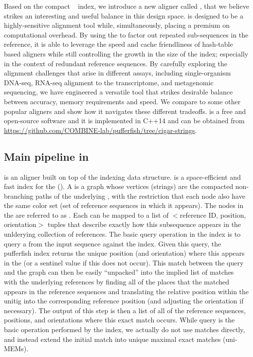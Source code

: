 Based on the compact \pufferfish~\citep{pufferfish} index, we introduce a new aligner called \puffaligner,
that we believe strikes an interesting and useful balance in this design space. \puffaligner is designed 
to be a highly-sensitive alignment tool while, simultaneously, placing a premium on computational overhead.
By using the \ccdbg to factor out repeated sub-sequences in the reference, it is able to leverage the speed 
and cache friendliness of hash-table based aligners while still controlling 
the growth in the size of the index; especially in the context of redundant reference sequences. By carefully 
exploring the alignment challenges that arise in different assays, including single-organism DNA-seq, 
RNA-seq alignment to the transcriptome, and metagenomic sequencing, we have engineered a versatile
tool that strikes desirable balance between accuracy, memory requirements and speed. We compare 
\puffaligner to some other popular aligners and show how it navigates these different tradeoffs. 
\puffaligner is a free and open-source software and it is implemented in C++14 and can be obtained 
from \url{https://github.com/COMBINE-lab/pufferfish/tree/cigar-strings}.

\subsection{Main pipeline in \puffaligner}
\puffaligner is an aligner built on top of the \pufferfish indexing data structure. \pufferfish is a 
space-efficient and fast index for the \ccdbg (\ccdbgshort). A \ccdbg is a graph whose vertices
(strings) are the compacted non-branching paths of the underlying \dbg, with the restriction that 
each node also have the same color set (set of reference sequences in which it appears). The nodes in the
\ccdbg are referred to as \unitigs. Each \unitig can be mapped to a list of $<$reference ID, position, 
orientation$>$ tuples that describe exactly how this subsequence appears in the unlderying
collection of references. The basic query operation in the \pufferfish index is to query 
a \kmer from the input sequence against the index. Given this query, the pufferfish index returns the unique
position (and orientation) where this \kmer appears in the \ccdbg (or  a sentinel value if this \kmer 
does not occur). This match between the query and the graph can then be easily ``unpacked'' into the implied list of 
matches with the underlying references by finding all of the places that the  matched \unitig appears in the 
reference sequences and translating the relative position within the unitig into the corresponding 
reference position (and adjusting the orientation if necessary). The output of this step is then a list of all 
of the reference sequences, positions, and orientations where this exact match occurs.  While \kmer query is the 
basic operation performed by the index, we actually do not use \kmer matches  directly, and instead 
extend the initial match into unique maximal exact matches (uni-MEMs).

